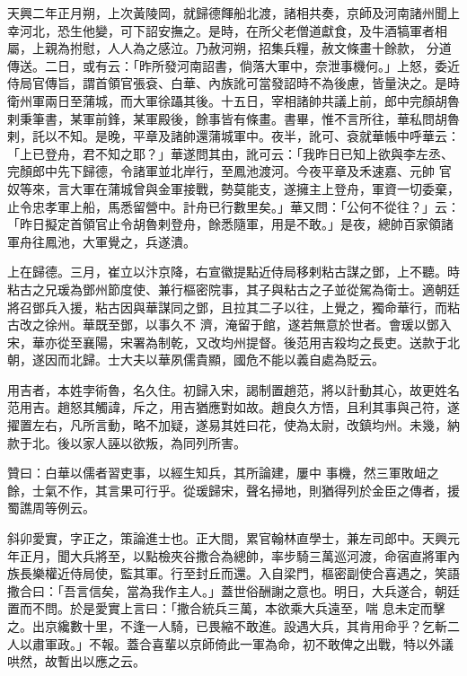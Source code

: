 \begin{pinyinscope}
 天興二年正月朔，上次黃陵岡，就歸德餫船北渡，諸相共奏，京師及河南諸州聞上幸河北，恐生他變，可下詔安撫之。是時，在所父老僧道獻食，及牛酒犒軍者相屬，上親為拊慰，人人為之感泣。乃赦河朔，招集兵糧，赦文條畫十餘款，
 分道傳送。二日，或有云：「昨所發河南詔書，倘落大軍中，奈泄事機何。」上怒，委近侍局官傳旨，謂首領官張袞、白華、內族訛可當發詔時不為後慮，皆量決之。是時衛州軍兩日至蒲城，而大軍徐躡其後。十五日，宰相諸帥共議上前，郎中完顏胡魯剌秉筆書，某軍前鋒，某軍殿後，餘事皆有條畫。書畢，惟不言所往，華私問胡魯剌，託以不知。是晚，平章及諸帥還蒲城軍中。夜半，訛可、袞就華帳中呼華云：「上已登舟，君不知之耶？」華遂問其由，訛可云：「我昨日已知上欲與李左丞、完顏郎中先下歸德，令諸軍並北岸行，至鳳池渡河。今夜平章及禾速嘉、元帥
 官奴等來，言大軍在蒲城曾與金軍接戰，勢莫能支，遂擁主上登舟，軍資一切委棄，止令忠孝軍上船，馬悉留營中。計舟已行數里矣。」華又問：「公何不從往？」云：「昨日擬定首領官止令胡魯剌登舟，餘悉隨軍，用是不敢。」是夜，總帥百家領諸軍舟往鳳池，大軍覺之，兵遂潰。



 上在歸德。三月，崔立以汴京降，右宣徽提點近侍局移剌粘古謀之鄧，上不聽。時粘古之兄瑗為鄧州節度使、兼行樞密院事，其子與粘古之子並從駕為衛士。適朝廷將召鄧兵入援，粘古因與華謀同之鄧，且拉其二子以往，上覺之，獨命華行，而粘古改之徐州。華既至鄧，以事久不
 濟，淹留于館，遂若無意於世者。會瑗以鄧入宋，華亦從至襄陽，宋署為制乾，又改均州提督。後范用吉殺均之長吏。送款于北朝，遂因而北歸。士大夫以華夙儒貴顯，國危不能以義自處為貶云。



 用吉者，本姓孛術魯，名久住。初歸入宋，謁制置趙范，將以計動其心，故更姓名范用吉。趙怒其觸諱，斥之，用吉猶應對如故。趙良久方悟，且利其事與己符，遂擢置左右，凡所言動，略不加疑，遂易其姓曰花，使為太尉，改鎮均州。未幾，納款于北。後以家人誣以欲叛，為同列所害。



 贊曰：白華以儒者習吏事，以經生知兵，其所論建，屢中
 事機，然三軍敗衄之餘，士氣不作，其言果可行乎。從瑗歸宋，聲名掃地，則猶得列於金臣之傳者，援蜀譙周等例云。



 斜卯愛實，字正之，策論進士也。正大間，累官翰林直學士，兼左司郎中。天興元年正月，聞大兵將至，以點檢夾谷撒合為總帥，率步騎三萬巡河渡，命宿直將軍內族長樂權近侍局使，監其軍。行至封丘而還。入自梁門，樞密副使合喜遇之，笑語撒合曰：「吾言信矣，當為我作主人。」蓋世俗酬謝之意也。明日，大兵遂合，朝廷置而不問。於是愛實上言曰：「撒合統兵三萬，本欲乘大兵遠至，喘
 息未定而擊之。出京纔數十里，不逢一人騎，已畏縮不敢進。設遇大兵，其肯用命乎？乞斬二人以肅軍政。」不報。蓋合喜輩以京師倚此一軍為命，初不敢俾之出戰，特以外議哄然，故暫出以應之云。




\end{pinyinscope}
